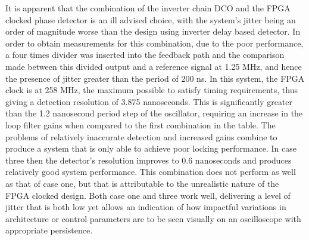 \documentclass[conference]{IEEEtran}
\begin{document}
It is apparent that the combination of the inverter chain DCO and the FPGA clocked phase detector is an ill advised choice, with the system's jitter being an order of magnitude worse than the design using inverter delay based detector. In order to obtain measurements for this combination, due to the poor performance, a four times divider was inserted into the feedback path and the comparison made between this divided output and a reference signal at 1.25 MHz, and hence the presence of jitter greater than the period of 200 ns. In this system, the FPGA clock is at 258 MHz, the maximum possible to satisfy timing requirements, thus giving a detection resolution of 3.875 nanoseconds. This is significantly greater than the 1.2 nanosecond period step of the oscillator, requiring an increase in the loop filter gains when compared to the first combination in the table. The problems of relatively inaccurate detection and increased gains combine to produce a system that is only able to achieve poor locking performance. In case three then the detector's resolution improves to 0.6 nanoseconds and produces relatively good system performance. This combination does not perform as well as that of case one, but that is attributable to the unrealistic nature of the FPGA clocked design. Both case one and three work well, delivering a level of jitter that is both low yet allows an indication of how impactful variations in architecture or control parameters are to be seen visually on an oscilloscope with appropriate persistence.\\


\end{document}
